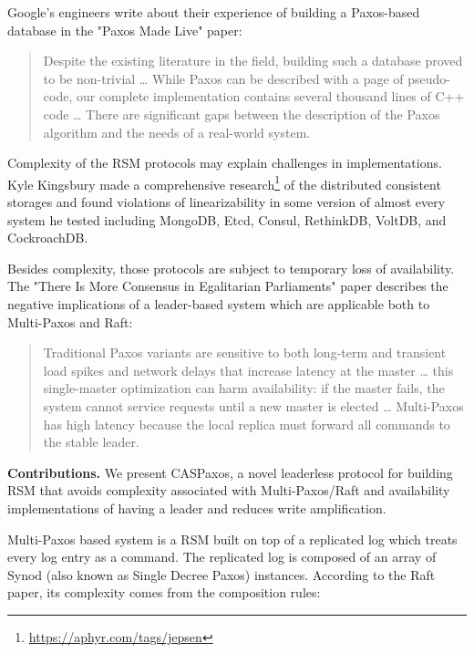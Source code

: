 \documentclass[a4paper,USenglish]{lipics-v2018}
\theoremstyle{definition}
\begin{document}
    Google's engineers write about their experience of building a Paxos-based database in the "Paxos Made Live"\cite{chubby} paper:

    \begin{quote}
        Despite the existing literature in the field, building such a database proved to be non-trivial \ldots{} While Paxos can be described with a page of pseudo-code, our complete implementation contains several thousand lines of C++ code \ldots{} There are significant gaps between the description of the Paxos algorithm and the needs of a real-world system.
    \end{quote}

    Complexity of the RSM protocols may explain challenges in implementations. Kyle Kingsbury made a comprehensive research\footnote{\href{https://aphyr.com/tags/jepsen}{https://aphyr.com/tags/jepsen}} of the distributed consistent storages and found violations of linearizability in some version of almost every system he tested including MongoDB, Etcd, Consul, RethinkDB, VoltDB, and CockroachDB.

    Besides complexity, those protocols are subject to temporary loss of availability. The "There Is More Consensus in Egalitarian Parliaments" paper\cite{epaxos} describes the negative implications of a leader-based system which are applicable both to Multi-Paxos and Raft:

    \begin{quote}
        Traditional Paxos variants are sensitive to both long-term and transient load spikes and network delays that increase latency at the master \ldots{} this single-master optimization can harm availability: if the master fails, the system cannot service requests until a new master is elected \ldots{} Multi-Paxos has high latency because the local replica must forward all commands to the stable leader.
    \end{quote}

    {\bf Contributions.} We present CASPaxos, a novel leaderless protocol for building RSM that avoids complexity associated with Multi-Paxos/Raft and availability implementations of having a leader and reduces write amplification.

    Multi-Paxos based system is a RSM built on top of a replicated log which treats every log entry as a command. The replicated log is composed of an array of Synod\cite{lamport01} (also known as Single Decree Paxos) instances. According to the Raft paper, its complexity comes from the composition rules:
\end{document}
